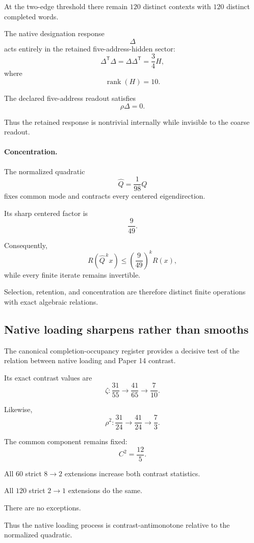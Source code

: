 At the two-edge threshold there remain \(120\) distinct contexts
with \(120\) distinct completed words.

The native designation response
\[
\Delta
\]
acts entirely in the retained five-address-hidden sector:
\[
\Delta^{\mathsf T}\Delta
=
\Delta\Delta^{\mathsf T}
=
\frac34H,
\]
where
\[
\operatorname{rank}(H)=10.
\]

The declared five-address readout satisfies
\[
\rho\Delta=0.
\]

Thus the retained response is nontrivial internally while invisible
to the coarse readout.

\paragraph{Concentration.}
The normalized quadratic
\[
\widehat Q=\frac1{98}Q
\]
fixes common mode and contracts every centered eigendirection.

Its sharp centered factor is
\[
\frac9{49}.
\]

Consequently,
\[
R(\widehat Q^{\,k}x)
\le
\left(\frac9{49}\right)^k R(x),
\]
while every finite iterate remains invertible.

Selection, retention, and concentration are therefore distinct
finite operations with exact algebraic relations.

\subsection{Native loading sharpens rather than smooths}

The canonical completion-occupancy register provides a decisive
test of the relation between native loading and Paper 14 contrast.

Its exact contrast values are
\[
\zeta:
\frac{31}{55}
\longrightarrow
\frac{41}{65}
\longrightarrow
\frac{7}{10}.
\]

Likewise,
\[
\rho^2:
\frac{31}{24}
\longrightarrow
\frac{41}{24}
\longrightarrow
\frac73.
\]

The common component remains fixed:
\[
C^2=\frac{12}{5}.
\]

All \(60\) strict \(8\to2\) extensions increase both contrast
statistics.

All \(120\) strict \(2\to1\) extensions do the same.

There are no exceptions.

Thus the native loading process is contrast-antimonotone relative to
the normalized quadratic.

